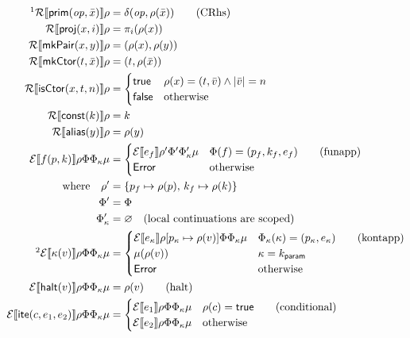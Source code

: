 \documentclass[a4paper, 11pt]{article}
\theoremstyle{remark}\newtheorem*{remark}{Remark}
\theoremstyle{definition}\newtheorem*{definition}{Definition}
\begin{document}
\begingroup\allowdisplaybreaks
\begin{align*}
\footnotemark\mathcal{R}\sem{\prim(\mathit{op}, \bar{x})}\Env &= \delta(\mathit{op}, \Env(\bar{x})) \tag{CRhs} \\
\mathcal{R}\sem{\proj(x, i)}\Env &= \pi_i(\Env(x)) \\
\mathcal{R}\sem{\mkpair(x, y)}\Env &= (\Env(x), \Env(y)) \\
\mathcal{R}\sem{\mkctor(t, \bar{x})}\Env &= (t, \Env(\bar{x})) \\
\mathcal{R}\sem{\isctor(x, t, n)}\Env &=
\begin{cases}
  \mathsf{true} & \Env(x) = (t, \bar{v}) \land |\bar{v}| = n \\
  \mathsf{false} & \text{otherwise}
\end{cases} \\
\mathcal{R}\sem{\mathsf{const}(k)}\Env &= k \\
\mathcal{R}\sem{\mathsf{alias}(y)}\Env &= \Env(y)\\
\mathcal{E}\sem{f(p, k)}\Env\FunTab\KontTab\mu &=
\begin{cases}
  \mathcal{E}\sem{e_f}\Env'\FunTab'\KontTab'\mu
  & \FunTab(f) = (p_f, k_f, e_f) \tag{funapp} \\
  \mathsf{Error} & \text{otherwise}
\end{cases}\\
\text{where}\quad\Env' &= \{p_f \mapsto \Env(p),\, k_f \mapsto \Env(k)\} \\
\FunTab' &= \FunTab \\
\KontTab' &= \varnothing \quad \text{(local continuations are scoped)}\\
\footnotemark\mathcal{E}\sem{\kappa(v)}\Env\FunTab\KontTab\mu &=
\begin{cases}
  \mathcal{E}\sem{e_\kappa}\Env[p_\kappa \mapsto \Env(v)]\FunTab\KontTab\mu
  & \KontTab(\kappa) = (p_\kappa, e_\kappa) \tag{kontapp} \\
  \mu(\Env(v))
  & \kappa = k_{\mathsf{param}} \\
  \mathsf{Error} & \text{otherwise}
\end{cases}\\
\mathcal{E}\sem{\halt(v)}\Env\FunTab\KontTab\mu &= \Env(v) \tag{halt}\\
\mathcal{E}\sem{\ite(c, e_1, e_2)}\Env\FunTab\KontTab\mu &=
\begin{cases}
  \mathcal{E}\sem{e_1}\Env\FunTab\KontTab\mu & \Env(c) = \mathsf{true} \tag{conditional} \\
  \mathcal{E}\sem{e_2}\Env\FunTab\KontTab\mu & \text{otherwise}

\end{cases}
\end{align*}
\end{document}
